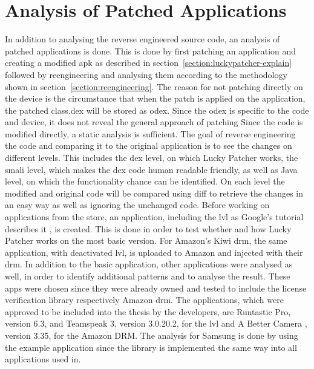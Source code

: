 \section{Analysis of Patched Applications} \label{section:luckypatcher-operation}
In addition to analysing the reverse engineered source code, an analysis of patched applications is done.
This is done by first patching an application and creating a modified apk as described in section~\ref{section:luckypatcher-explain} followed by reengineering and analysing them according to the methodology shown in section~\ref{section:reengineering}.
The reason for not patching directly on the device is the circumstance that when the patch is applied on the application, the patched class.dex will be stored as odex.
Since the odex is specific to the code and device, it does not reveal the general approach of patching
Since the code is modified directly, a static analysis is sufficient.
\newline
The goal of reverse engineering the code and comparing it to the original application is to see the changes on different levels.
This includes the \gls{dex} level, on which Lucky Patcher works, the smali level, which makes the \gls{dex} code human readable friendly, as well as Java level, on which the functionality chance can be identified.
On each level the modified and original code will be compared using diff to retrieve the changes in an easy way as well as ignoring the unchanged code.
\newline
Before working on applications from the store, an application, including the \gls{lvl} as Google's tutorial describes it \cite{developersLicensingAdding}, is created.
This is done in order to test whether and how Lucky Patcher works on the most basic version.
For Amazon's Kiwi \gls{drm}, the same application, with deactivated \gls{lvl}, is uploaded to Amazon and injected with their \gls{drm}.
In addition to the basic application, other applications were analysed as well, in order to identify additional patterns and to analyse the result.
These apps were chosen since they were already owned and tested to include the license verification library respectively Amazon \gls{drm}.
The applications, which were approved to be included into the thesis by the developers, are Runtastic Pro\cite{runtasticApp}, version 6.3, and Teamspeak 3\cite{teamspeakApp}, version 3.0.20.2, for the \gls{lvl} and A Better Camera \cite{abettercamera}, version 3.35, for the Amazon DRM.
The analysis for Samsung is done by using the example application since the library is implemented the same way into all applications used in.

